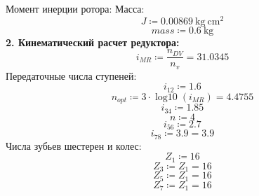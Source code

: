 \documentclass{article}
\newcommand{\defeq}{\coloneq} %
\begin{document}
\colorbox[HTML]{000000}{Момент инерции ротора:}\newline
\colorbox[HTML]{000000}{Масса: }\newline
\begin{equation*}
J \defeq 0.00869 \: \mathrm{kg} \: \mathrm{cm}^{2}
\end{equation*}
\begin{equation*}
mass \defeq 0.6 \: \mathrm{kg}
\end{equation*}
\colorbox[HTML]{000000}{\textbf{2. Кинематический расчет редуктора:}}\newline
\begin{equation*}
i_{MR} \defeq \frac{n_{DV}}{n_{v}} = {31.0345}
\end{equation*}
\colorbox[HTML]{000000}{Передаточные числа ступеней:}\newline
\begin{equation*}
\textit{i}_{\textit{12}} \defeq 1.6
\end{equation*}
\begin{equation*}
n_{opt} \defeq 3 \cdot \operatorname{log10} \left( i_{MR} \right) = {4.4755}
\end{equation*}
\begin{equation*}
\textit{i}_{\textit{34}} \defeq 1.85
\end{equation*}
\begin{equation*}
n \defeq 4
\end{equation*}
\begin{equation*}
\textit{i}_{\textit{56}} \defeq 2.7
\end{equation*}
\begin{equation*}
\textit{i}_{\textit{78}} \defeq 3.9 = {3.9}
\end{equation*}
\colorbox[HTML]{000000}{Числа зубьев шестерен и колес:}\newline
\begin{equation*}
\textit{Z}_{\textit{1}} \defeq 16
\end{equation*}
\begin{equation*}
\textit{Z}_{\textit{3}} \defeq \textit{Z}_{\textit{1}} = {16}
\end{equation*}
\begin{equation*}
\textit{Z}_{\textit{5}} \defeq \textit{Z}_{\textit{1}} = {16}
\end{equation*}
\begin{equation*}
\textit{Z}_{\textit{7}} \defeq \textit{Z}_{\textit{1}} = {16}
\end{equation*}
\end{document}
